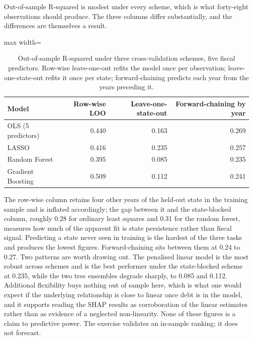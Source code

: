 \documentclass[12pt,a4paper]{article}
\begin{document}
Out-of-sample R-squared is modest under every scheme, which is what forty-eight observations should produce. The three columns differ substantially, and the differences are themselves a result.

\begin{table}[H]
\centering
\caption{Out-of-sample R-squared under three cross-validation schemes, five fiscal predictors. Row-wise leave-one-out refits the model once per observation; leave-one-state-out refits it once per state; forward-chaining predicts each year from the years preceding it.}
\label{tab:31}
\footnotesize
\begin{adjustbox}{max width=\textwidth}
\begin{tabular}{@{}lrrr@{}}
\toprule
Model & Row-wise LOO & Leave-one-state-out & Forward-chaining by year \\
\midrule
OLS (5 predictors) & 0.440 & 0.163 & 0.269 \\
LASSO & 0.416 & 0.235 & 0.257 \\
Random Forest & 0.395 & 0.085 & 0.235 \\
Gradient Boosting & 0.509 & 0.112 & 0.241 \\
\bottomrule
\end{tabular}
\end{adjustbox}
\end{table}

The row-wise column retains four other years of the held-out state in the training sample and is inflated accordingly; the gap between it and the state-blocked column, roughly 0.28 for ordinary least squares and 0.31 for the random forest, measures how much of the apparent fit is state persistence rather than fiscal signal. Predicting a state never seen in training is the hardest of the three tasks and produces the lowest figures. Forward-chaining sits between them at 0.24 to 0.27. Two patterns are worth drawing out. The penalised linear model is the most robust across schemes and is the best performer under the state-blocked scheme at 0.235, while the two tree ensembles degrade sharply, to 0.085 and 0.112. Additional flexibility buys nothing out of sample here, which is what one would expect if the underlying relationship is close to linear once debt is in the model, and it supports reading the SHAP results as corroboration of the linear estimates rather than as evidence of a neglected non-linearity. None of these figures is a claim to predictive power. The exercise validates an in-sample ranking; it does not forecast.
\end{document}
